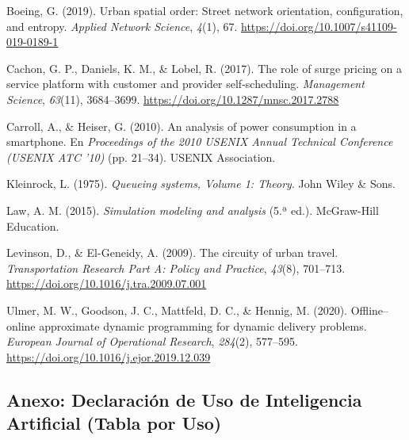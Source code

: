\documentclass[11pt,letterpaper]{article}
\begin{document}
\vspace{0.3em}
\noindent Boeing, G. (2019). Urban spatial order: Street network orientation, configuration, and entropy. \textit{Applied Network Science}, \textit{4}(1), 67. \url{https://doi.org/10.1007/s41109-019-0189-1}

\vspace{0.3em}
\noindent Cachon, G. P., Daniels, K. M., \& Lobel, R. (2017). The role of surge pricing on a service platform with customer and provider self-scheduling. \textit{Management Science}, \textit{63}(11), 3684–3699. \url{https://doi.org/10.1287/mnsc.2017.2788}

\vspace{0.3em}
\noindent Carroll, A., \& Heiser, G. (2010). An analysis of power consumption in a smartphone. En \textit{Proceedings of the 2010 USENIX Annual Technical Conference (USENIX ATC '10)} (pp. 21–34). USENIX Association.

\vspace{0.3em}
\noindent Kleinrock, L. (1975). \textit{Queueing systems, Volume 1: Theory}. John Wiley \& Sons.

\vspace{0.3em}
\noindent Law, A. M. (2015). \textit{Simulation modeling and analysis} (5.ª ed.). McGraw-Hill Education.

\vspace{0.3em}
\noindent Levinson, D., \& El-Geneidy, A. (2009). The circuity of urban travel. \textit{Transportation Research Part A: Policy and Practice}, \textit{43}(8), 701–713. \url{https://doi.org/10.1016/j.tra.2009.07.001}

\vspace{0.3em}
\noindent Ulmer, M. W., Goodson, J. C., Mattfeld, D. C., \& Hennig, M. (2020). Offline–online approximate dynamic programming for dynamic delivery problems. \textit{European Journal of Operational Research}, \textit{284}(2), 577–595. \url{https://doi.org/10.1016/j.ejor.2019.12.039}

\subsection{Anexo: Declaración de Uso de Inteligencia Artificial (Tabla por Uso)}
\end{document}
